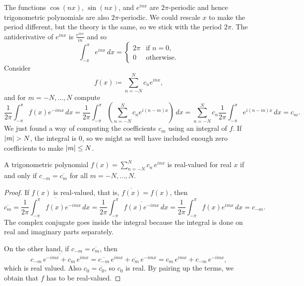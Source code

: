 The functions $\cos (nx)$, $\sin (nx)$, and $e^{inx}$ are $2\pi$-periodic
and hence trigonometric
polynomials are also $2\pi$-periodic.
We could rescale $x$ to make the period different, but the theory is the
same, so we stick with the period $2\pi$.
The antiderivative of $e^{inx}$ is $\frac{e^{inx}}{in}$ and
so
\begin{equation*}
\int_{-\pi}^\pi e^{inx} \, dx =
\begin{cases}
2\pi & \text{if } n=0, \\
0    & \text{otherwise.}
\end{cases}
\end{equation*}
Consider
\begin{equation*}
f(x) \coloneqq \sum_{n=-N}^N c_n e^{inx} ,
\end{equation*}
and for $m=-N,\ldots,N$ compute
\begin{equation*}
\frac{1}{2\pi} \int_{-\pi}^\pi
f(x) e^{-imx} \, dx
=
\frac{1}{2\pi} \int_{-\pi}^\pi
\left(\sum_{n=-N}^N c_n e^{i(n-m)x}\right) \, dx
=
\sum_{n=-N}^N
c_n
\frac{1}{2\pi}
\int_{-\pi}^\pi
e^{i(n-m)x}
 \, dx
=
c_m .
\end{equation*}
We just found a way of computing the coefficients $c_m$ using an integral
of $f$.  If $\lvert {m} \rvert > N$, the integral is 0, so we might as
well have included enough zero coefficients to make $\lvert {m} \rvert \leq N$.

\begin{prop}
A trigonometric polynomial
$f(x) = \sum_{n=-N}^N c_n\, e^{inx}$
is real-valued for real $x$ if
and only if $c_{-m} = \overline{c_m}$ for all $m=-N,\ldots,N$.
\end{prop}

\begin{proof}
If $f(x)$ is real-valued, that is, $\overline{f(x)} = f(x)$, then
\begin{equation*}
\overline{c_m}
=
\overline{
\frac{1}{2\pi} \int_{-\pi}^\pi
f(x) e^{-imx} \, dx
}
=
\frac{1}{2\pi} \int_{-\pi}^\pi
\overline{
f(x) e^{-imx} } \, dx
=
\frac{1}{2\pi} \int_{-\pi}^\pi
f(x) e^{imx} \, dx
= c_{-m} .
\end{equation*}
The complex conjugate goes inside the integral because the integral is
done on real and imaginary parts separately.

On the other hand, if 
$c_{-m} = \overline{c_m}$, then
\begin{equation*}
\overline{c_{-m}\, e^{-imx}+ c_{m}\, e^{imx}}
=
\overline{c_{-m}}\, e^{imx}+ \overline{c_{m}}\, e^{-imx}
=
c_{m}\, e^{imx}+ c_{-m}\, e^{-imx} ,
\end{equation*}
which is real valued.  Also $c_0 = \overline{c_0}$, so
$c_0$ is real.
By pairing up the terms, we obtain that $f$ has to be real-valued.
\end{proof}

